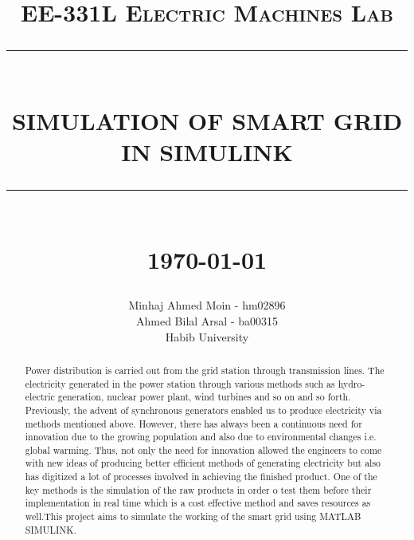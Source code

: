 \documentclass[12pt]{report}
\newcommand{\HRule}[1]{\rule{\linewidth}{#1}}
\begin{document}
\title{ \normalsize \textsc{EE-331L Electric Machines Lab}
		\\ [2.0cm]
		\HRule{0.5pt} \\
		\LARGE \textbf{\uppercase{Simulation of Smart Grid in Simulink}}
		\HRule{2pt} \\ [0.5cm]
		\normalsize \today \vspace*{5\baselineskip}}

\date{}

\author{
		Minhaj Ahmed Moin - hm02896 \\ 
		Ahmed Bilal Arsal - ba00315 \\
		Habib University \\}

\maketitle

\begin{abstract}
    Power distribution is carried out from the grid station through transmission lines. The electricity generated in the power station through various methods such as hydro-electric generation, nuclear power plant, wind turbines and so on and so forth. Previously, the advent of synchronous generators enabled us to produce electricity via methods mentioned above. However, there has always been a continuous need for innovation due to the growing population and also due to environmental changes i.e. global warming. Thus, not only the need for innovation allowed the engineers to come with new ideas of producing better efficient methods of generating electricity but also has digitized a lot of processes involved in achieving the finished product. One of the key methods is the simulation of the raw products in order o test them before their implementation in real time which is a cost effective method and saves resources as well.This project aims to simulate the working of the smart grid using MATLAB SIMULINK.
\end{abstract}



\end{document}
